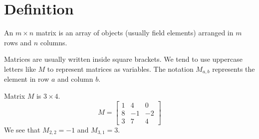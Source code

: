 \section{Definition}

\begin{definition}
	An $m \times n$ matrix is an array of objects (usually field elements) arranged in $m$ rows and $n$ columns.
\end{definition}

Matrices are usually written inside square brackets.
We tend to use uppercase letters like $M$ to represent matrices as variables.
The notation $M_{a,b}$ represents the element in row $a$ and column $b$.

\begin{example}
	Matrix $M$ is $3 \times 4$.
	\begin{equation*}
		M = \begin{bmatrix}
			1 & 4  & 0 \\
			8 & -1 & -2 \\
			3 & 7  & 4
		\end{bmatrix}
	\end{equation*}
	We see that $M_{2,2} = -1$ and $M_{3,1} = 3$.
\end{example}

